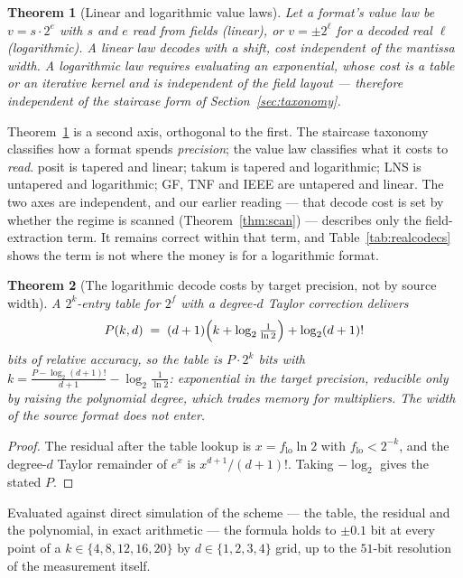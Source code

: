\documentclass[11pt]{article}
\newtheorem{theorem}{Theorem}
\theoremstyle{definition}
\begin{document}
\begin{theorem}[Linear and logarithmic value laws]
\label{thm:valuelaw}
Let a format's value law be $v = s \cdot 2^{e}$ with $s$ and $e$ read from fields
(\emph{linear}), or $v = \pm 2^{\ell}$ for a decoded real $\ell$
(\emph{logarithmic}). A linear law decodes with a shift, cost independent of the
mantissa width. A logarithmic law requires evaluating an exponential, whose cost
is a table or an iterative kernel and is independent of the field layout ---
therefore independent of the staircase form of Section~\ref{sec:taxonomy}.
\end{theorem}

Theorem~\ref{thm:valuelaw} is a second axis, orthogonal to the first. The
staircase taxonomy classifies how a format spends \emph{precision}; the value law
classifies what it costs to \emph{read}. posit is tapered and linear; takum is
tapered and logarithmic; LNS is untapered and logarithmic; GF, TNF and IEEE are
untapered and linear. The two axes are independent, and our earlier reading ---
that decode cost is set by whether the regime is scanned
(Theorem~\ref{thm:scan}) --- describes only the field-extraction term. It remains
correct within that term, and Table~\ref{tab:realcodecs} shows the term is not
where the money is for a logarithmic format.


\begin{theorem}[The logarithmic decode costs by target precision, not by source width]
\label{thm:targetprec}
A $2^{k}$-entry table for $2^{f}$ with a degree-$d$ Taylor correction delivers
\[
P(k,d) \;=\; (d+1)\Bigl(k + \log_2\tfrac{1}{\ln 2}\Bigr) + \log_2 (d+1)!
\]
bits of relative accuracy, so the table is $P \cdot 2^{k}$ bits with
$k = \frac{P - \log_2 (d+1)!}{d+1} - \log_2\frac{1}{\ln 2}$: exponential in the
target precision, reducible only by raising the polynomial degree, which trades
memory for multipliers. The width of the source format does not enter.
\end{theorem}

\begin{proof}
The residual after the table lookup is $x = f_{\mathrm{lo}}\ln 2$ with
$f_{\mathrm{lo}} < 2^{-k}$, and the degree-$d$ Taylor remainder of $e^{x}$ is
$x^{d+1}/(d+1)!$. Taking $-\log_2$ gives the stated $P$.
\end{proof}

Evaluated against direct simulation of the scheme --- the table, the residual and
the polynomial, in exact arithmetic --- the formula holds to $\pm 0.1$ bit at every
point of a $k \in \{4,8,12,16,20\}$ by $d \in \{1,2,3,4\}$ grid, up to the
$51$-bit resolution of the measurement itself.
\end{document}
